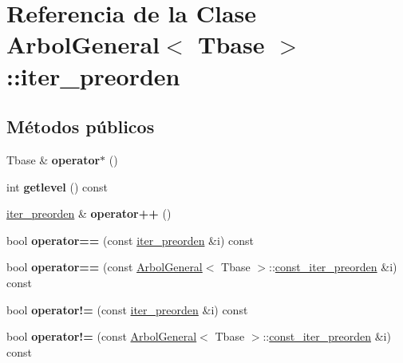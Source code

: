 \hypertarget{class_arbol_general_1_1iter__preorden}{}\section{Referencia de la Clase Arbol\+General$<$ Tbase $>$\+:\+:iter\+\_\+preorden}
\label{class_arbol_general_1_1iter__preorden}
\subsection*{Métodos públicos}
\begin{DoxyCompactItemize}
\item 
Tbase \& {\bfseries operator$\ast$} ()\hypertarget{class_arbol_general_1_1iter__preorden_a9361fd196b058b72741f23deb3be1baf}{}\label{class_arbol_general_1_1iter__preorden_a9361fd196b058b72741f23deb3be1baf}

\item 
int {\bfseries getlevel} () const \hypertarget{class_arbol_general_1_1iter__preorden_af7998e2c1051608ecb39ef3a7e5af589}{}\label{class_arbol_general_1_1iter__preorden_af7998e2c1051608ecb39ef3a7e5af589}

\item 
\hyperlink{class_arbol_general_1_1iter__preorden}{iter\+\_\+preorden} \& {\bfseries operator++} ()\hypertarget{class_arbol_general_1_1iter__preorden_ad99644bea6d9c67c58ff0b22fe7780d0}{}\label{class_arbol_general_1_1iter__preorden_ad99644bea6d9c67c58ff0b22fe7780d0}

\item 
bool {\bfseries operator==} (const \hyperlink{class_arbol_general_1_1iter__preorden}{iter\+\_\+preorden} \&i) const \hypertarget{class_arbol_general_1_1iter__preorden_a95b405ffd7732315ac1948a2531b101d}{}\label{class_arbol_general_1_1iter__preorden_a95b405ffd7732315ac1948a2531b101d}

\item 
bool {\bfseries operator==} (const \hyperlink{class_arbol_general}{Arbol\+General}$<$ Tbase $>$\+::\hyperlink{class_arbol_general_1_1const__iter__preorden}{const\+\_\+iter\+\_\+preorden} \&i) const \hypertarget{class_arbol_general_1_1iter__preorden_a6fec5b6929540b2096310c4eeaa7edda}{}\label{class_arbol_general_1_1iter__preorden_a6fec5b6929540b2096310c4eeaa7edda}

\item 
bool {\bfseries operator!=} (const \hyperlink{class_arbol_general_1_1iter__preorden}{iter\+\_\+preorden} \&i) const \hypertarget{class_arbol_general_1_1iter__preorden_a9ee1bdf29431e64e22eb00b99ee63c0f}{}\label{class_arbol_general_1_1iter__preorden_a9ee1bdf29431e64e22eb00b99ee63c0f}

\item 
bool {\bfseries operator!=} (const \hyperlink{class_arbol_general}{Arbol\+General}$<$ Tbase $>$\+::\hyperlink{class_arbol_general_1_1const__iter__preorden}{const\+\_\+iter\+\_\+preorden} \&i) const \hypertarget{class_arbol_general_1_1iter__preorden_a2328f604d82632a1ddc8f197e681ddc9}{}\label{class_arbol_general_1_1iter__preorden_a2328f604d82632a1ddc8f197e681ddc9}

\end{DoxyCompactItemize}
